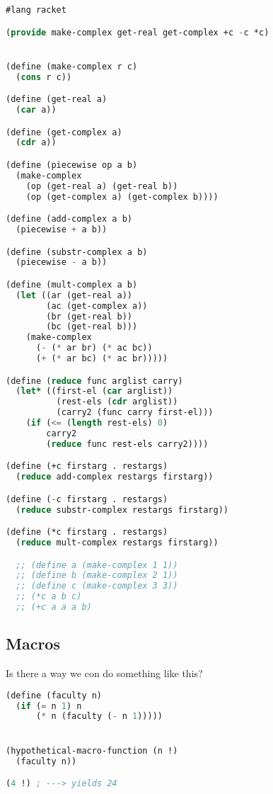 \begin{lstlisting}[language=lisp]
#lang racket

(provide make-complex get-real get-complex +c -c *c)


(define (make-complex r c)
  (cons r c))

(define (get-real a)
  (car a))

(define (get-complex a)
  (cdr a))

(define (piecewise op a b)
  (make-complex
    (op (get-real a) (get-real b))
    (op (get-complex a) (get-complex b))))

(define (add-complex a b)
  (piecewise + a b))

(define (substr-complex a b)
  (piecewise - a b))

(define (mult-complex a b)
  (let ((ar (get-real a))
        (ac (get-complex a))
        (br (get-real b))
        (bc (get-real b)))
    (make-complex
      (- (* ar br) (* ac bc))
      (+ (* ar bc) (* ac br)))))

(define (reduce func arglist carry)
  (let* ((first-el (car arglist))
          (rest-els (cdr arglist))
          (carry2 (func carry first-el)))
    (if (<= (length rest-els) 0)
        carry2
        (reduce func rest-els carry2))))

(define (+c firstarg . restargs)
  (reduce add-complex restargs firstarg))

(define (-c firstarg . restargs)
  (reduce substr-complex restargs firstarg))

(define (*c firstarg . restargs)
  (reduce mult-complex restargs firstarg))

  ;; (define a (make-complex 1 1))
  ;; (define b (make-complex 2 1))
  ;; (define c (make-complex 3 3))
  ;; (*c a b c)
  ;; (+c a a a b)
\end{lstlisting}

\subsection{Macros}

Is there a way we con do something like this?
\begin{lstlisting}[language=lisp]
(define (faculty n)
  (if (= n 1) n
      (* n (faculty (- n 1)))))


(hypothetical-macro-function (n !)
  (faculty n))

(4 !) ; ---> yields 24
\end{lstlisting}

